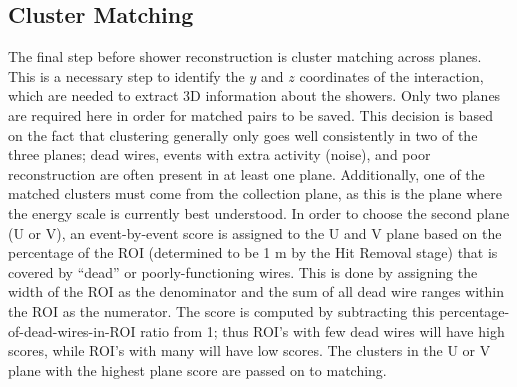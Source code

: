 


\subsection{Cluster Matching}
The final step before shower reconstruction is cluster matching across planes. This is a necessary step to identify the $y$ and $z$ coordinates of the interaction, which are needed to extract 3D information about the showers. Only two planes are required here in order for matched pairs to be saved. This decision is based on the fact that clustering generally only goes well consistently in two of the three planes; dead wires, events with extra activity (noise), and poor reconstruction are often present in at least one plane. Additionally, one of the matched clusters must come from the collection plane, as this is the plane where the energy scale is currently best understood.  In order to choose the second plane (U or V), an event-by-event score is assigned to the U and V plane based on the percentage of the ROI (determined to be 1 m by the Hit Removal stage) that is covered by ``dead'' or poorly-functioning wires.  
 This is done by assigning the width of the ROI as the denominator and the sum of all dead wire ranges within the ROI as the numerator. The score is computed by subtracting this percentage-of-dead-wires-in-ROI ratio from 1; thus ROI's with few dead wires will have high scores, while ROI's with many will have low scores.  The clusters in the U or V plane with the highest plane score are passed on to matching. 

